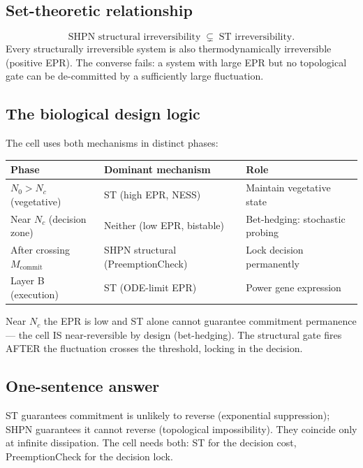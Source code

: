 \documentclass[11pt,a4paper]{article}
\begin{document}
\subsection*{Set-theoretic relationship}

\[
  \text{SHPN structural irreversibility} \;\subsetneq\; \text{ST irreversibility}.
\]
Every structurally irreversible system is also thermodynamically irreversible
(positive EPR).  The converse fails: a system with large EPR but no topological
gate can be de-committed by a sufficiently large fluctuation.

\subsection*{The biological design logic}

The cell uses both mechanisms in distinct phases:

\begin{center}
\small
\begin{tabular}{lll}
\toprule
\textbf{Phase} & \textbf{Dominant mechanism} & \textbf{Role} \\
\midrule
$N_0 > N_c$ (vegetative)   & ST (high EPR, NESS)          & Maintain vegetative state \\
Near $N_c$ (decision zone) & Neither (low EPR, bistable)  & Bet-hedging: stochastic probing \\
After crossing $M_{\text{commit}}$ & SHPN structural (PreemptionCheck) & Lock decision permanently \\
Layer B (execution)        & ST (ODE-limit EPR)           & Power gene expression \\
\bottomrule
\end{tabular}
\end{center}

Near $N_c$ the EPR is low and ST alone cannot guarantee commitment permanence
--- the cell IS near-reversible by design (bet-hedging).  The structural gate
fires AFTER the fluctuation crosses the threshold, locking in the decision.

\subsection*{One-sentence answer}

ST guarantees commitment is unlikely to reverse (exponential suppression);
SHPN guarantees it cannot reverse (topological impossibility).  They coincide
only at infinite dissipation.  The cell needs both: ST for the decision cost,
PreemptionCheck for the decision lock.
\end{document}

